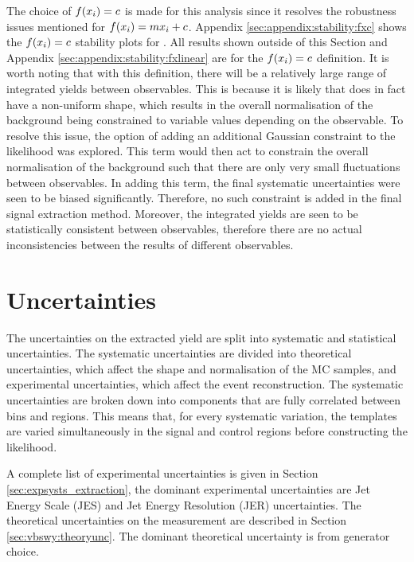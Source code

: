 The choice of $f(x_i)=c$ is made for this analysis since it resolves the robustness issues mentioned for $f(x_i)=mx_i+c$. Appendix \ref{sec:appendix:stability:fxc} shows the $f(x_i)=c$ stability plots for \mjj. All results shown outside of this Section and Appendix \ref{sec:appendix:stability:fxlinear} are for the $f(x_i)=c$ definition. It is worth noting that with this definition, there will be a relatively large range of integrated yields between observables. This is because it is likely that \fx does in fact have a non-uniform shape, which results in the overall normalisation of the \qcdwy background being constrained to variable values depending on the observable. To resolve this issue, the option of adding an additional Gaussian constraint to the likelihood was explored. This term would then act to constrain the overall normalisation of the \qcdwy background such that there are only very small fluctuations between observables. In adding this term, the final systematic uncertainties were seen to be biased significantly. Therefore, no such constraint is added in the final signal extraction method. Moreover, the integrated yields are seen to be statistically consistent between observables, therefore there are no actual inconsistencies between the results of different observables. 

\clearpage
\section{Uncertainties}\label{sec:vbswy:extraction_uncertainties}

The uncertainties on the extracted \ewwy yield are split into systematic and statistical uncertainties. The systematic uncertainties are divided into theoretical uncertainties, which affect the shape and normalisation of the MC samples, and experimental uncertainties, which affect the event reconstruction. The systematic uncertainties are broken down into components that are fully correlated between bins and regions. This means that, for every systematic variation, the templates are varied simultaneously in the signal and control regions before constructing the likelihood.

A complete list of experimental uncertainties is given in Section \ref{sec:expsysts_extraction}, the dominant experimental uncertainties are Jet Energy Scale (JES) and Jet Energy Resolution (JER) uncertainties. The theoretical uncertainties on the measurement are described in Section \ref{sec:vbswy:theoryunc}. The dominant theoretical uncertainty is from \qcdwy generator choice. 
%

